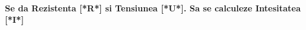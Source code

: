 \documentclass{exam}
\begin{document}
\paragraph{
Se da Rezistenta [*R*] si Tensiunea [*U*].
Sa se calculeze Intesitatea [*I*]
}
\end{document}
